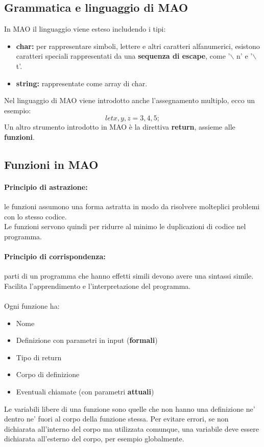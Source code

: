 \documentclass[a4paper,12pt]{article}
\begin{document}
\subsection{Grammatica e linguaggio di MAO}
In MAO il linguaggio viene esteso includendo i tipi:
\begin{itemize}
  \item \textbf{char:} per rappresentare simboli, lettere e altri caratteri alfanumerici, esistono caratteri speciali rappresentati da una \textbf{sequenza di escape}, come '$\backslash$ n' e '$\backslash$ t'.
  \item \textbf{string: } rappresentate come array di char.
\end{itemize}
Nel linguaggio di MAO viene introdotto anche l'assegnamento multiplo, ecco un esempio:
\[
let x,y,z = 3,4,5;
\]
Un altro strumento introdotto in MAO è la direttiva \textbf{return}, assieme alle \textbf{funzioni}.

\subsection{Funzioni in MAO}
\paragraph{Principio di astrazione: } le funzioni assumono una forma astratta in modo da risolvere molteplici problemi con lo stesso codice.\\
Le funzioni servono quindi per ridurre al minimo le duplicazioni di codice nel programma.
\paragraph{Principio di corrispondenza: } parti di un programma che hanno effetti simili devono avere una sintassi simile. Facilita l'apprendimento e l'interpretazione del programma.\\\\
Ogni funzione ha:
\begin{itemize}
  \item Nome
  \item Definizione con parametri in input (\textbf{formali})
  \item Tipo di return
  \item Corpo di definizione
  \item Eventuali chiamate (con parametri \textbf{attuali})
\end{itemize}
Le variabili libere di una funzione sono quelle che non hanno una definizione ne' dentro ne' fuori al corpo della funzione stessa. Per evitare errori, se non dichiarata all'interno del corpo ma utilizzata comunque, una variabile deve essere dichiarata all'esterno del corpo, per esempio globalmente.
\end{document}
